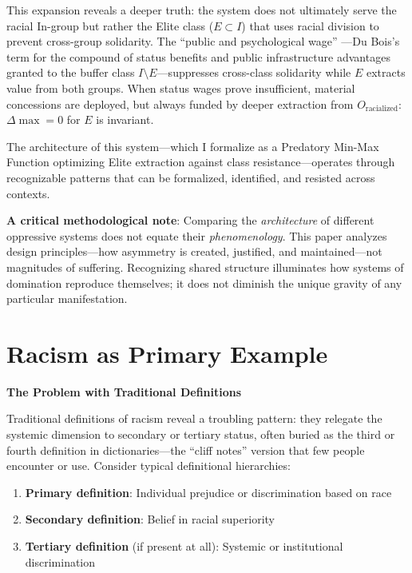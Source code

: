 \documentclass[12pt,openany]{book}
\begin{document}
This expansion reveals a deeper truth: the system does not ultimately serve the racial In-group but rather the Elite class ($E \subset I$) that uses racial division to prevent cross-group solidarity. The ``public and psychological wage'' \cite{dubois, roediger}---Du Bois's term for the compound of status benefits and public infrastructure advantages granted to the buffer class $I \setminus E$---suppresses cross-class solidarity while $E$ extracts value from both groups. When status wages prove insufficient, material concessions are deployed, but always funded by deeper extraction from $O_{\text{racialized}}$: $\Delta\max = 0$ for $E$ is invariant.

The architecture of this system---which I formalize as a Predatory Min-Max Function optimizing Elite extraction against class resistance---operates through recognizable patterns that can be formalized, identified, and resisted across contexts.

\textbf{A critical methodological note}: Comparing the \textit{architecture} of different oppressive systems does not equate their \textit{phenomenology}. This paper analyzes design principles---how asymmetry is created, justified, and maintained---not magnitudes of suffering. Recognizing shared structure illuminates how systems of domination reproduce themselves; it does not diminish the unique gravity of any particular manifestation.

\section{Racism as Primary Example}

\textbf{The Problem with Traditional Definitions}

Traditional definitions of racism reveal a troubling pattern: they relegate the systemic dimension to secondary or tertiary status, often buried as the third or fourth definition in dictionaries---the ``cliff notes'' version that few people encounter or use. Consider typical definitional hierarchies:

\begin{enumerate}
    \item \textbf{Primary definition}: Individual prejudice or discrimination based on race
    \item \textbf{Secondary definition}: Belief in racial superiority
    \item \textbf{Tertiary definition} (if present at all): Systemic or institutional discrimination
\end{enumerate}
\end{document}
